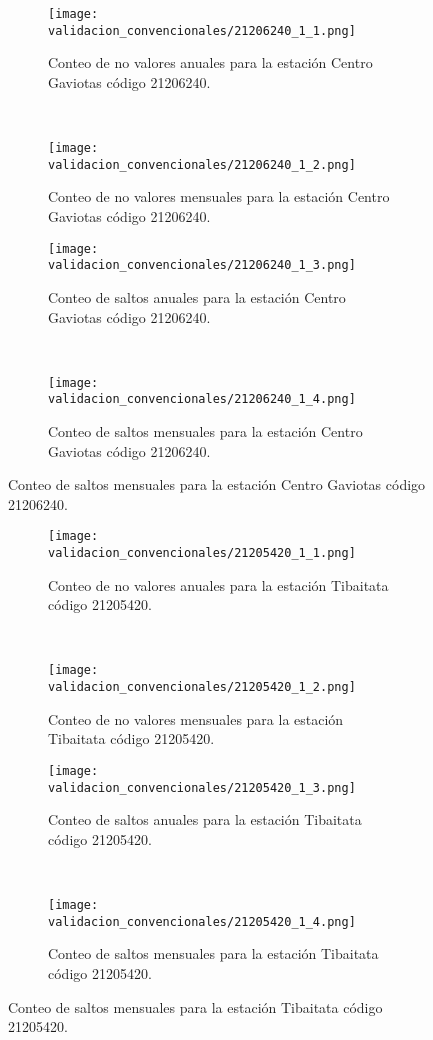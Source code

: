 \begin{figure}[H]\ContinuedFloat
\centering
	\begin{subfigure}[normla]{0.4\textwidth}
	\texttt{[image: validacion\_convencionales/21206240\_1\_1.png]}
		\caption{Conteo de no valores anuales para la estación Centro Gaviotas código 21206240.}
		\label{subfig:a1}
		\end{subfigure}
		~
    \begin{subfigure}[normla]{0.4\textwidth}
	\texttt{[image: validacion\_convencionales/21206240\_1\_2.png]}
		\caption{Conteo de no valores mensuales para la estación Centro Gaviotas código 21206240.}
		\label{subfig:a2}
		\end{subfigure}
		
    \begin{subfigure}[normla]{0.4\textwidth}
	\texttt{[image: validacion\_convencionales/21206240\_1\_3.png]}
		\caption{Conteo de saltos anuales para la estación Centro Gaviotas código 21206240.}
		\label{subfig:a1}
		\end{subfigure}
		~
    \begin{subfigure}[normla]{0.4\textwidth}
	\texttt{[image: validacion\_convencionales/21206240\_1\_4.png]}
		\caption{Conteo de saltos mensuales para la estación Centro Gaviotas código 21206240.}
		\label{subfig:a2}
		\end{subfigure}

	
\end{figure}
           
\begin{figure}[H]\ContinuedFloat
\centering
	\begin{subfigure}[normla]{0.4\textwidth}
	\texttt{[image: validacion\_convencionales/21205420\_1\_1.png]}
		\caption{Conteo de no valores anuales para la estación Tibaitata código 21205420.}
		\label{subfig:a1}
		\end{subfigure}
		~
    \begin{subfigure}[normla]{0.4\textwidth}
	\texttt{[image: validacion\_convencionales/21205420\_1\_2.png]}
		\caption{Conteo de no valores mensuales para la estación Tibaitata código 21205420.}
		\label{subfig:a2}
		\end{subfigure}
		
    \begin{subfigure}[normla]{0.4\textwidth}
	\texttt{[image: validacion\_convencionales/21205420\_1\_3.png]}
		\caption{Conteo de saltos anuales para la estación Tibaitata código 21205420.}
		\label{subfig:a1}
		\end{subfigure}
		~
    \begin{subfigure}[normla]{0.4\textwidth}
	\texttt{[image: validacion\_convencionales/21205420\_1\_4.png]}
		\caption{Conteo de saltos mensuales para la estación Tibaitata código 21205420.}
		\label{subfig:a2}
		\end{subfigure}

	
\end{figure}
           
